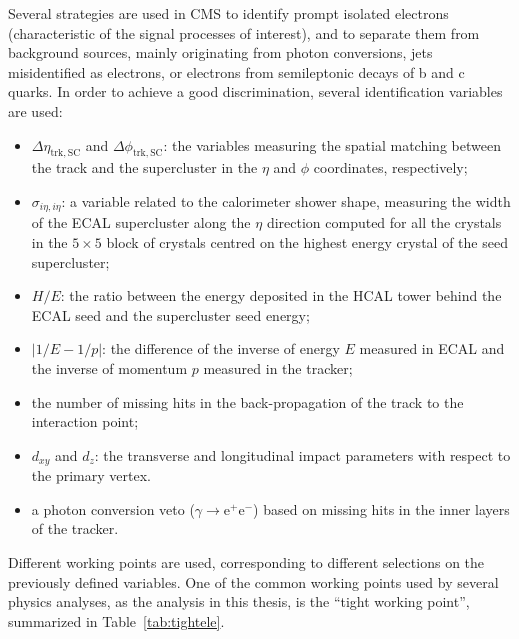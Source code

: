 Several strategies are used in CMS to identify prompt isolated electrons (characteristic of the signal processes of interest), and to separate them from background sources, mainly originating from photon conversions, jets misidentified as electrons, or electrons from semileptonic decays of b and c quarks. In order to achieve a good discrimination, several identification variables are used:
\begin{itemize}
\item $\Delta\eta_\mathrm{trk,SC}$ and $\Delta\phi_\mathrm{trk,SC}$: the variables measuring the spatial matching between the track and the supercluster in the $\eta$ and $\phi$ coordinates, respectively;
\item $\sigma_{i\eta,i\eta}$: a variable related to the calorimeter shower shape, measuring the width of the ECAL supercluster along the $\eta$ direction computed for all the crystals in the $5
\times 5$ block of crystals centred on the highest energy crystal of the seed supercluster;
\item $H/E$: the ratio between the energy deposited in the HCAL tower behind the ECAL seed and the supercluster seed energy;
\item $|1/E - 1/p|$: the difference of the inverse of energy $E$ measured in ECAL and the inverse of momentum $p$ measured in the tracker;
\item the number of missing hits in the back-propagation of the track to the interaction point;
\item $d_{xy}$ and $d_z$: the transverse and longitudinal impact parameters with respect to the primary vertex.
\item a photon conversion veto ($\gamma \to \mathrm{e^+ e^-}$) based on missing hits in the inner layers of the tracker.
\end{itemize}

Different working points are used, corresponding to different selections on the previously defined variables. One of the common working points used by several physics analyses, as the \hww analysis in this thesis, is the ``tight working point'', summarized in Table~\ref{tab:tightele}.

